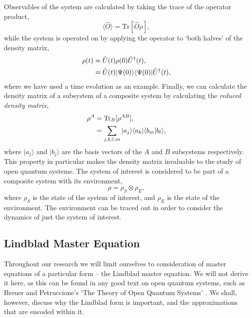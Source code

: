 Observables of the system are calculated by taking the trace of the operator product,
\begin{equation}
	\langle \hat{O} \rangle = \mathrm{Tr}[\hat{O}\rho],
	\label{eq:oqs2-5}
\end{equation}
while the system is operated on by applying the operator to `both halves' of the density matrix,
\begin{align}
	\rho (t) &= \hat{U}(t) \rho(0) \hat{U}^{\dagger}(t), \notag \\
	&= \hat{U}(t) | \Psi(0) \rangle \langle \Psi(0) | \hat{U}^{\dagger}(t),
	\label{eq:oqs2-6}
\end{align}  
where we have used a time evolution as an example. Finally, we can calculate the density matrix of a subsystem of a composite system by calculating the \emph{reduced density matrix},
\begin{align}
	\rho^{A} &= \mathrm{Tr}_{B}[\rho^{AB}], \notag \\
	&= \sum_{j,k,l,m} |a_{j} \rangle \langle a_{k}| \langle b_{m} | b_{l} \rangle,
	\label{eq:oqs2-7}
\end{align}
where \(|a_{j} \rangle\) and \(|b_{j} \rangle\) are the basis vectors of the \(A\) and \(B\) subsystems respectively. This property in particular makes the density matrix invaluable to the study of open quantum systems. The system of interest is considered to be part of a composite system with its environment,
\begin{equation}
	\rho = \rho_{S} \otimes \rho_{E},
	\label{eq:oqs2-8}
\end{equation}
where \(\rho_{S}\) is the state of the system of interest, and \(\rho_{E}\) is the state of the environment. The environment can be traced out in order to consider the dynamics of just the system of interest. 

\subsection{Lindblad Master Equation}
Throughout our research we will limit ourselves to consideration of master equations of a particular form -- the Lindblad master equation. We will not derive it here, as this can be found in any good text on open quantum systems, such as Breuer and Petruccione's `The Theory of Open Quantum Systems' \cite{BP_TMQME}. We shall, however, discuss why the Lindblad form is important, and the approximations that are encoded within it. 

